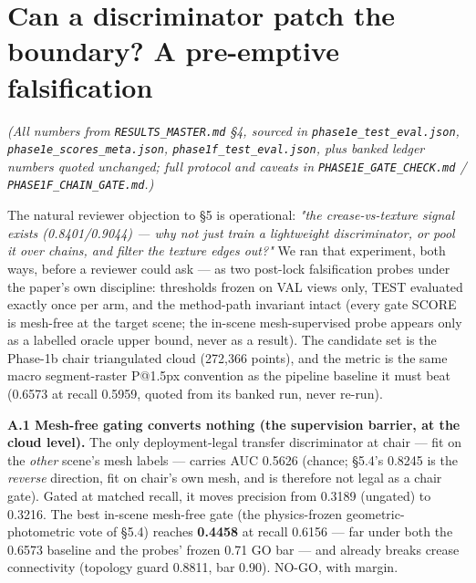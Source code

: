 \appendices
\section{Can a discriminator patch the boundary? A pre-emptive falsification}
\emph{(All numbers from \texttt{RESULTS\_MASTER.md} \S4, sourced in \texttt{phase1e\_test\_eval.json},
\texttt{phase1e\_scores\_meta.json}, \texttt{phase1f\_test\_eval.json}, plus banked ledger numbers
quoted unchanged; full protocol and caveats in \texttt{PHASE1E\_GATE\_CHECK.md} /
\texttt{PHASE1F\_CHAIN\_GATE.md}.)}

The natural reviewer objection to \S5 is operational: \emph{"the crease-vs-texture signal
exists (0.8401/0.9044) --- why not just train a lightweight discriminator, or pool it over
chains, and filter the texture edges out?"} We ran that experiment, both ways, before a
reviewer could ask --- as two post-lock falsification probes under the paper's own
discipline: thresholds frozen on VAL views only, TEST evaluated exactly once per arm, and
the method-path invariant intact (every gate SCORE is mesh-free at the target scene; the
in-scene mesh-supervised probe appears only as a labelled oracle upper bound, never as a
result). The candidate set is the Phase-1b chair triangulated cloud (272,366 points), and
the metric is the same macro segment-raster P@1.5px convention as the pipeline baseline
it must beat (0.6573 at recall 0.5959, quoted from its banked run, never re-run).

\textbf{A.1 Mesh-free gating converts nothing (the supervision barrier, at the cloud level).}
The only deployment-legal transfer discriminator at chair --- fit on the \emph{other} scene's
mesh labels --- carries AUC 0.5626 (chance; \S5.4's 0.8245 is the \emph{reverse} direction, fit
on chair's own mesh, and is therefore not legal as a chair gate). Gated at matched
recall, it moves precision from 0.3189 (ungated) to 0.3216. The best in-scene mesh-free
gate (the physics-frozen geometric-photometric vote of \S5.4) reaches \textbf{0.4458} at recall
0.6156 --- far under both the 0.6573 baseline and the probes' frozen 0.71 GO bar --- and
already breaks crease connectivity (topology guard 0.8811, bar 0.90). NO-GO, with margin.


